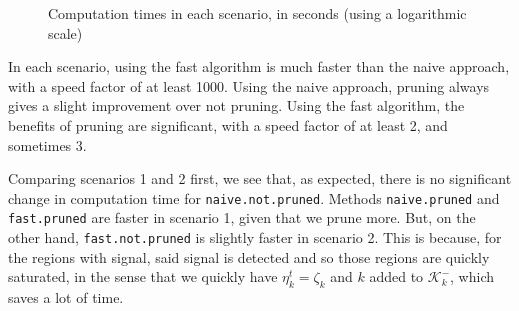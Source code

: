 \documentclass[
  11pt,
  a4paper,
]{article}
\theoremstyle{definition}
\theoremstyle{plain}
\theoremstyle{plain}
\theoremstyle{plain}
\theoremstyle{definition}
\theoremstyle{remark}
\begin{document}
\begin{figure}


\caption{\label{fig-benchmark01}Computation times in each scenario, in
seconds (using a logarithmic scale)}

\end{figure}%

In each scenario, using the fast algorithm is much faster than the naive
approach, with a speed factor of at least 1000. Using the naive
approach, pruning always gives a slight improvement over not pruning.
Using the fast algorithm, the benefits of pruning are significant, with
a speed factor of at least 2, and sometimes 3.

Comparing scenarios 1 and 2 first, we see that, as expected, there is no
significant change in computation time for \texttt{naive.not.pruned}.
Methods \texttt{naive.pruned} and \texttt{fast.pruned} are faster in
scenario 1, given that we prune more. But, on the other hand,
\texttt{fast.not.pruned} is slightly faster in scenario 2. This is
because, for the regions with signal, said signal is detected and so
those regions are quickly saturated, in the sense that we quickly have
\(\eta_k^t=\zeta_k\) and \(k\) added to \(\mathcal{K}^-_k\), which saves
a lot of time.
\end{document}
